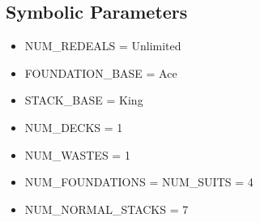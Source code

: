 \documentclass[12pt, titlepage]{article}
\begin{document}
	\subsection{Symbolic Parameters}
		\begin{itemize}
			\itemsep0em
			\item NUM\_REDEALS = Unlimited
			\item FOUNDATION\_BASE = Ace
			\item STACK\_BASE = King
			\item NUM\_DECKS = 1
			\item NUM\_WASTES = 1
			\item NUM\_FOUNDATIONS = NUM\_SUITS = 4
			\item NUM\_NORMAL\_STACKS = 7
		\end{itemize}
\end{document}
